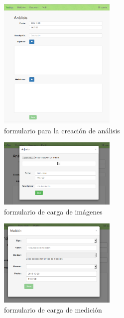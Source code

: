 \documentclass[a4paper,12pt]{article}
\begin{document}
    \begin{figure}[h]
        \centering
        \includegraphics[width=0.5\textwidth]{img/5-crear_analisis}
        \caption{formulario para la creación de análisis}
		\label{5-crear_analisis}
    \end{figure}
    
    \begin{figure}[h]
        \centering
        \includegraphics[width=0.5\textwidth]{img/5-cargar_img}
        \caption{formulario de carga de imágenes}
		\label{5-cargar_img}
    \end{figure}
    \begin{figure}[h]
        \centering
        \includegraphics[width=0.5\textwidth]{img/5-cargar_medicion}
        \caption{formulario de carga de medición}
		\label{5-cargar_medicion}
    \end{figure}
\end{document}
